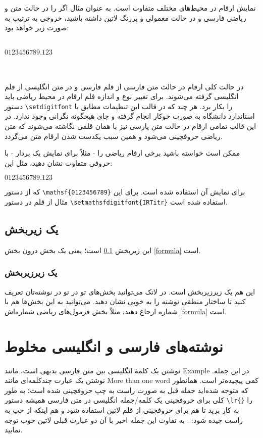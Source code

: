 نمایش ارقام در محیط‌های مختلف متفاوت است. به عنوان مثال اگر  را  در حالت متن و ریاضی فارسی و در حالت معمولی و پررنگ لاتین داشته باشید، خروجی به ترتیب به صورت زیر خواهد بود:
 \begin{LTR}
 \\
 $0123456789.123$\\
 \\
\\
\end{LTR}
 در حالت کلی ارقام در حالت متن فارسی از قلم فارسی و در متن انگلیسی از قلم انگلیسی گرفته می‌شوند. 
 برای تغییر نوع و اندازه قلم ارقام در محیط ریاضی باید  دستور \Verb+\setdigitfont+ را بکار برد. 
 هر چند که در قالب   این تنظیمات مطابق با استاندارد دانشگاه به صورت خوکار انجام گرفته و جای هیچگونه نگرانی وجود ندارد. 
 در این قالب تمامی ارقام در حالت متن پارسی نیز با همان قلمی نگاشته می‌شوند که متن ریاضی حروفچینی می‌شود و همین سبب یکدست شدن 
 ارقام متن می‌گردد. 
 
   ممکن است خواسته باشید برخی ارقام ریاضی را - مثلاً برای نمایش یک بردار - با حروفی متفاوت نشان دهید، مثل این: 
\begin{LTR}
 \noindent
$\mathsf{0123456789.123}$ 
\end{LTR}


که از دستور 
\Verb!\mathsf{0123456789}!
برای نمایش آن استفاده شده است. برای این مثال از قلم 
در دستور \Verb!\setmathsfdigitfont{IRTitr}!
استفاده شده است.

\subsection{یک زیربخش}\label{zirbakhsh}

این زیربخش \ref{zirbakhsh} است؛ یعنی یک بخش درون بخش \ref{formula} است.
\subsubsection{یک زیرزیربخش}
این هم یک زیرزیربخش است. در لاتک می‌توانید بخش‌های تو در تو در نوشته‌تان تعریف کنید تا ساختار منطقی نوشته را به خوبی نشان دهید. 
می‌توانید به‌ این بخش‌ها هم با شماره ارجاع دهید، مثلاً بخش فرمول‌های ریاضی شماره‌اش \ref{formula} است.
\section{نوشته‌های فارسی و انگلیسی مخلوط}
نوشتن یک کلمهٔ انگلیسی بین متن فارسی بدیهی است، مانند Example در این جمله.
نوشتن یک عبارت چندکلمه‌ای مانند
More than one word کمی پیچیده‌تر است.
    همانطور که متوجه شده‌اید جمله قبل به صورت راست به چپ حروفچینی شده است؛ به طور کلی برای حروفچینی یک کلمه/جمله انگلیسی در متن فارسی
    همیشه دستور \Verb+\lr{}+ را به کار برید تا هم برای حروفچینی از قلم لاتین استفاده شود و هم اینکه از چپ به راست چیده شود: .
    به تفاوت این جمله اخیر با آن دو عبارت قبلی لاتین خوب توجه نمایید. 

